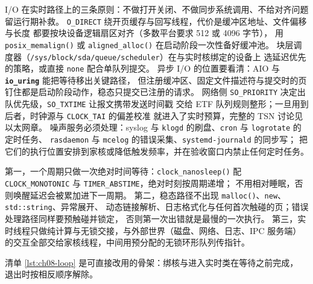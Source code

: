 \documentclass[12pt,a4paper,fontset=fandol]{ctexbook}
\newcommand{\Fn}[1]{\texttt{#1()}}
\newcommand{\Tp}[1]{\texttt{#1}}
\newcommand{\Lib}[1]{\textbf{\texttt{#1}}}
\begin{document}
I/O 在实时路径上的三条原则：不做打开关闭、不做同步系统调用、不给对齐问题留运行期补救。
\Tp{O\_DIRECT} 绕开页缓存与回写线程，代价是缓冲区地址、文件偏移与长度
都要按块设备逻辑扇区对齐（多数平台要求 512 或 4096 字节），
用 \Fn{posix\_memalign} 或 \Fn{aligned\_alloc} 在启动阶段一次性备好缓冲池。
块层调度器（\Tp{/sys/block/sda/queue/scheduler}）在与实时核绑定的设备上
选延迟优先的策略，或直接 \Tp{none} 配合单队列提交。
异步 I/O 的位置要看清：AIO 与 \Lib{io\_uring} 能把等待移出关键路径，
但注册缓冲区、固定文件描述符与提交时的页钉住都是启动阶段动作，稳态只提交已注册的请求。
网络侧 \Tp{SO\_PRIORITY} 决定出队优先级，\Tp{SO\_TXTIME} 让报文携带发送时间戳
交给 ETF 队列规则整形；一旦用到后者，时钟源与 \Tp{CLOCK\_TAI} 的偏差校准
就进入了实时预算，完整的 TSN 讨论见以太网章。
噪声服务必须处理：syslog 与 \Tp{klogd} 的刷盘、\Tp{cron} 与 \Tp{logrotate} 的定时任务、
\Tp{rasdaemon} 与 \Tp{mcelog} 的错误采集、\Tp{systemd-journald} 的同步写；
把它们的执行位置安排到家核或降低触发频率，并在验收窗口内禁止任何定时任务。

\begin{bestpractice}[title={稳态循环的三条铁律}]
第一，一个周期只做一次绝对时间等待：\Fn{clock\_nanosleep} 配
\Tp{CLOCK\_MONOTONIC} 与 \Tp{TIMER\_ABSTIME}，绝对时刻按周期递增；
不用相对睡眠，否则唤醒延迟会被累加进下一周期。
第二，稳态路径不出现 \Fn{malloc}、\Tp{new}、\Tp{std::string}、异常展开、
动态链接解析、日志格式化与任何首次触碰的页；错误处理路径同样要预触碰并锁定，
否则第一次出错就是最慢的一次执行。
第三，实时线程只做纯计算与无锁交接，与外部世界（磁盘、网络、日志、IPC 服务端）
的交互全部交给家核线程，中间用预分配的无锁环形队列传指针。
\end{bestpractice}

清单 \ref{lst:ch08-loop} 是可直接改用的骨架：绑核与进入实时类在等待之前完成，
退出时按相反顺序解除。
\end{document}
